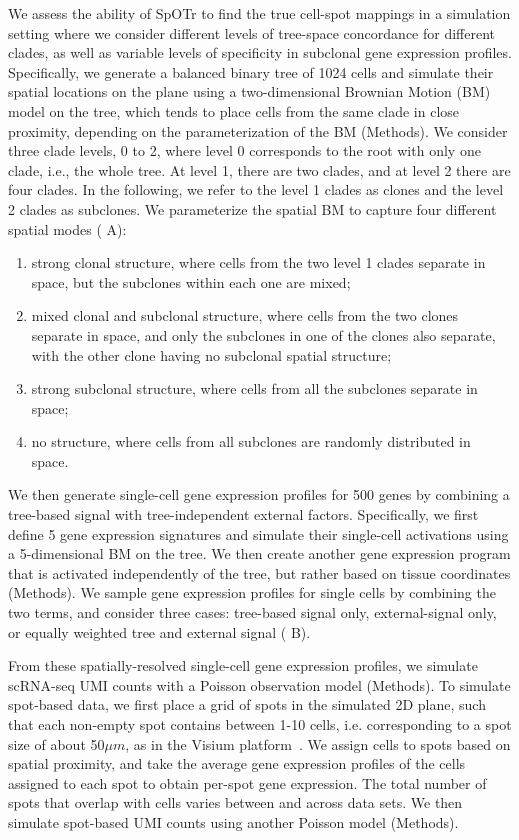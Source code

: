 \documentclass{article}
\newcommand{\toolnamex}{SpOTr }
\begin{document}
We assess the ability of \toolnamex to find the true cell-spot mappings in a simulation setting where we consider different levels of tree-space concordance for different clades, as well as variable levels of specificity in subclonal gene expression profiles. Specifically, we generate a balanced binary tree of 1024 cells and simulate their spatial locations on the plane using a two-dimensional Brownian Motion (BM) model on the tree, which tends to place cells from the same clade in close proximity, depending on the parameterization of the BM (Methods). We consider three clade levels, 0 to 2, where level 0 corresponds to the root with only one clade, i.e., the whole tree. At level 1, there are two clades, and at level 2 there are four clades. In the following, we refer to the level 1 clades as clones and the level 2 clades as subclones. We parameterize the spatial BM to capture four different spatial modes ( A):
\begin{enumerate}
    \item strong clonal structure, where cells from the two level 1 clades separate in space, but the subclones within each one are mixed;
    \item mixed clonal and subclonal structure, where cells from the two clones separate in space, and only the subclones in one of the clones also separate, with the other clone having no subclonal spatial structure;
    \item strong subclonal structure, where cells from all the subclones separate in space;
    \item no structure, where cells from all subclones are randomly distributed in space.
\end{enumerate}

We then generate single-cell gene expression profiles for 500 genes by combining a tree-based signal with tree-independent external factors. Specifically, we first define 5 gene expression signatures and simulate their single-cell activations using a 5-dimensional BM on the tree. We then create another gene expression program that is activated independently of the tree, but rather based on tissue coordinates (Methods). We sample gene expression profiles for single cells by combining the two terms, and consider three cases: tree-based signal only, external-signal only, or equally weighted tree and external signal ( B).

From these spatially-resolved single-cell gene expression profiles, we simulate scRNA-seq UMI counts with a Poisson observation model (Methods). To simulate spot-based data, we first place a grid of spots in the simulated 2D plane, such that each non-empty spot contains between 1-10 cells, i.e. corresponding to a spot size of about 50$\mu m$, as in the Visium platform~\cite{janesick2023high}. We assign cells to spots based on spatial proximity, and take the average gene expression profiles of the cells assigned to each spot to obtain per-spot gene expression. The total number of spots that overlap with cells varies between and across data sets. We then simulate spot-based UMI counts using another Poisson model (Methods). 
\end{document}
